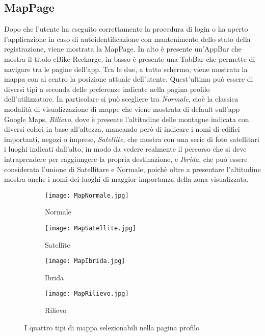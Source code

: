 \subsection{MapPage}
Dopo che l'utente ha eseguito correttamente la procedura di login o ha aperto
l'applicazione in caso di autoidentificazione con mantenimento dello stato della
registrazione, viene mostrata la MapPage. In alto è presente un'AppBar che 
mostra il titolo eBike-Recharge, in basso è presente una TabBar che permette di
navigare tra le pagine dell'app. Tra le due, a tutto schermo, viene mostrata la
mappa con al centro la posizione attuale dell'utente. Quest'ultima può essere di
diversi tipi a seconda delle preferenze indicate nella pagina profilo
dell'utilizzatore. In particolare si può scegliere tra \textit{Normale}, cioè la
classica modalità di visualizzazione di mappe che viene mostrata di default
sull'app Google Maps, \textit{Rilievo}, dove è presente l'altitudine delle
montagne indicata con diversi colori in base all'altezza, mancando però
di indicare i nomi di edifici importanti, negozi o imprese, \textit{Satellite},
che mostra con una serie di foto satellitari i luoghi indicati dall'alto, in
modo da vedere realmente il percorso che si deve intraprendere
per raggiungere la propria destinazione, e \textit{Ibrida}, che può essere
considerata l'unione di Satellitare e Normale, poichè oltre a presentare
l'altitudine mostra anche i nomi dei luoghi di maggior importanza della zona
visualizzata.

\begin{figure}[h!]
    \centering
    \begin{subfigure}{0.33\linewidth}
        \texttt{[image: MapNormale.jpg]}
        \caption{Normale}
    \end{subfigure}
    \begin{subfigure}{0.33\linewidth}
        \texttt{[image: MapSatellite.jpg]}
        \caption{Satellite}
    \end{subfigure}
    \begin{subfigure}{0.33\linewidth}
        \texttt{[image: MapIbrida.jpg]}
        \caption{Ibrida}
    \end{subfigure}
    \begin{subfigure}{0.33\linewidth}
        \texttt{[image: MapRilievo.jpg]}
        \caption{Rilievo}
    \end{subfigure}
    \caption{I quattro tipi di mappa selezionabili nella pagina profilo}
    \label{TipoMappa}
\end{figure} 

